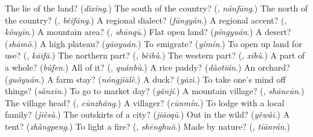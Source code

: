 \begin{tcolorbox}[breakable,colback=teal!4,colframe=teal!35!black,title={Before you move on}]
The lie of the land? (\emph{dìxíng}.) The south of the country? (\textbf{}, \emph{nánfāng}.) The north of the country? (\textbf{}, \emph{běifāng}.) A regional dialect? (\emph{fāngyán}.) A regional accent? (\textbf{}, \emph{kǒuyīn}.) A mountain area? (\textbf{}, \emph{shānqū}.) Flat open land? (\emph{píngyuán}.) A desert? (\emph{shāmò}.) A high plateau? (\emph{gāoyuán}.) To emigrate? (\emph{yímín}.) To open up land for use? (\textbf{}, \emph{kāifā}.) The northern part? (\textbf{}, \emph{běibù}.) The western part? (\textbf{}, \emph{xībù}.) A part of a whole? (\emph{bùfen}.) All of it? (\textbf{}, \emph{quánbù}.) A rice paddy? (\emph{dàotián}.) An orchard? (\emph{guǒyuán}.) A farm stay? (\emph{nóngjiālè}.) A duck? (\emph{yāzi}.) To take one's mind off things? (\emph{sànxīn}.) To go to market day? (\emph{gǎnjí}.) A mountain village? (\textbf{}, \emph{shāncūn}.) The village head? (\textbf{}, \emph{cūnzhǎng}.) A villager? (\emph{cūnmín}.) To lodge with a local family? (\emph{jièsù}.) The outskirts of a city? (\emph{jiāoqū}.) Out in the wild? (\emph{yěwài}.) A tent? (\emph{zhàngpeng}.) To light a fire? (\textbf{}, \emph{shēnghuǒ}.) Made by nature? (\textbf{}, \emph{tiānrán}.)
\end{tcolorbox}
